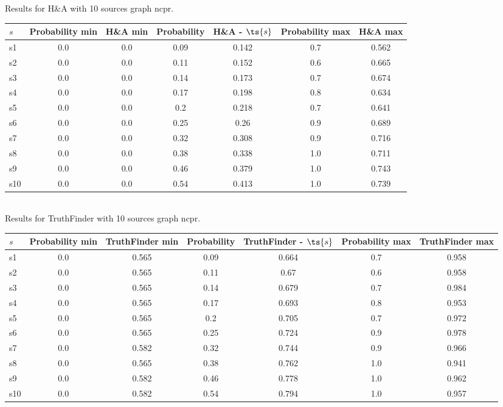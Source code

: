 \documentclass{article}
\begin{document}
\noindent Results for H\&A with 10 sources graph ncpr.

\noindent\begin{tabular}{|l|c|c|c|c|c|c|}
\hline
$s$& Probability min & H\&A min & Probability & H\&A - $\ts{s}$ & Probability max & H\&A max\\
\hline
s1 &0.0 & 0.0 & 0.09 & 0.142 & 0.7 & 0.562\\
\hline
s2 &0.0 & 0.0 & 0.11 & 0.152 & 0.6 & 0.665\\
\hline
s3 &0.0 & 0.0 & 0.14 & 0.173 & 0.7 & 0.674\\
\hline
s4 &0.0 & 0.0 & 0.17 & 0.198 & 0.8 & 0.634\\
\hline
s5 &0.0 & 0.0 & 0.2 & 0.218 & 0.7 & 0.641\\
\hline
s6 &0.0 & 0.0 & 0.25 & 0.26 & 0.9 & 0.689\\
\hline
s7 &0.0 & 0.0 & 0.32 & 0.308 & 0.9 & 0.716\\
\hline
s8 &0.0 & 0.0 & 0.38 & 0.338 & 1.0 & 0.711\\
\hline
s9 &0.0 & 0.0 & 0.46 & 0.379 & 1.0 & 0.743\\
\hline
s10 &0.0 & 0.0 & 0.54 & 0.413 & 1.0 & 0.739\\
\hline
\end{tabular}\\

\noindent Results for TruthFinder with 10 sources graph ncpr.

\noindent\begin{tabular}{|l|c|c|c|c|c|c|}
\hline
$s$& Probability min & TruthFinder min & Probability & TruthFinder - $\ts{s}$ & Probability max & TruthFinder max\\
\hline
s1 &0.0 & 0.565 & 0.09 & 0.664 & 0.7 & 0.958\\
\hline
s2 &0.0 & 0.565 & 0.11 & 0.67 & 0.6 & 0.958\\
\hline
s3 &0.0 & 0.565 & 0.14 & 0.679 & 0.7 & 0.984\\
\hline
s4 &0.0 & 0.565 & 0.17 & 0.693 & 0.8 & 0.953\\
\hline
s5 &0.0 & 0.565 & 0.2 & 0.705 & 0.7 & 0.972\\
\hline
s6 &0.0 & 0.565 & 0.25 & 0.724 & 0.9 & 0.978\\
\hline
s7 &0.0 & 0.582 & 0.32 & 0.744 & 0.9 & 0.966\\
\hline
s8 &0.0 & 0.565 & 0.38 & 0.762 & 1.0 & 0.941\\
\hline
s9 &0.0 & 0.582 & 0.46 & 0.778 & 1.0 & 0.962\\
\hline
s10 &0.0 & 0.582 & 0.54 & 0.794 & 1.0 & 0.957\\
\hline
\end{tabular}\\
\end{document}
